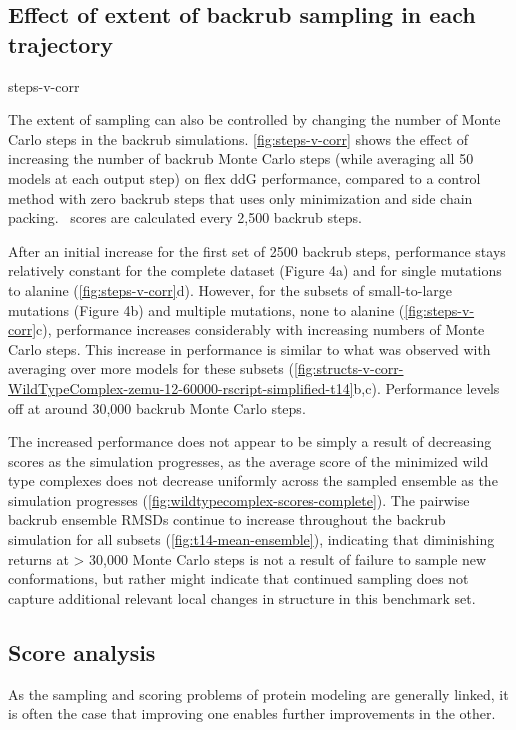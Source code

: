 \subsection{Effect of extent of backrub sampling in each trajectory}

{steps-v-corr}

The extent of sampling can also be controlled by changing the number of Monte Carlo steps in the backrub simulations.
\cref{fig:steps-v-corr} shows the effect of increasing the number of backrub Monte Carlo steps (while averaging all 50 models at each output step) on flex ddG performance, compared to a control method with zero backrub steps that uses only minimization and side chain packing.
\ddg\ scores are calculated every 2,500 backrub steps.

After an initial increase for the first set of 2500 backrub steps, performance stays relatively constant for the complete dataset (Figure 4a) and for single mutations to alanine (\cref{fig:steps-v-corr}d). However, for the subsets of small-to-large mutations (Figure 4b) and multiple mutations, none to alanine (\cref{fig:steps-v-corr}c), performance increases considerably with increasing numbers of Monte Carlo steps. This increase in performance is similar to what was observed with averaging over more models for these subsets (\cref{fig:structs-v-corr-WildTypeComplex-zemu-12-60000-rscript-simplified-t14}b,c).
Performance levels off at around 30,000 backrub Monte Carlo steps.

The increased performance does not appear to be simply a result of decreasing scores as the simulation progresses, as the average score of the minimized wild type complexes does not decrease uniformly across the sampled ensemble as the simulation progresses (\cref{fig:wildtypecomplex-scores-complete}).
The pairwise backrub ensemble RMSDs continue to increase throughout the backrub simulation for all subsets (\cref{fig:t14-mean-ensemble}), indicating that diminishing returns at > 30,000 Monte Carlo steps is not a result of failure to sample new conformations, but rather might indicate that continued sampling does not capture additional relevant local changes in structure in this benchmark set.

\subsection{Score analysis}

As the sampling and scoring problems of protein modeling are generally linked, it is often the case that improving one enables further improvements in the other.


